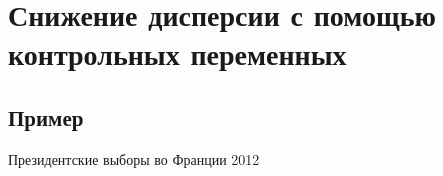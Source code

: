 
\section{Снижение дисперсии с помощью контрольных переменных}
\subsection{Пример}

\begin{frame}{Президентские выборы во Франции 2012 \parencite{pons2018will}}
\begin{columns}
\begin{column}{0.5\textwidth} 
    

\end{column}
\end{columns}
\end{frame}
